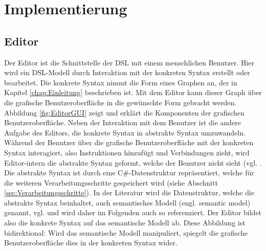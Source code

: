 \chapter{Implementierung}
\label{chap:Implementierung}

\section{Editor}
\label{sec:Editor}
Der Editor ist die Schnittstelle der DSL mit einem menschlichen Benutzer. Hier wird ein DSL-Modell durch Interaktion mit der konkreten Syntax erstellt oder bearbeitet. Die konkrete Syntax nimmt die Form eines Graphen an, der in Kapitel \ref{chap:Einleitung} beschrieben ist. Mit dem Editor kann dieser Graph über die grafische Benutzeroberfläche in die gewünschte Form gebracht werden. Abbildung \ref{fig:EditorGUI} zeigt und erklärt die Komponenten der grafischen Benutzeroberfläche.
\newline 
Neben der Interaktion mit dem Benutzer ist die andere Aufgabe des Editors, die konkrete Syntax in abstrakte Syntax umzuwandeln. Während der Benutzer über die grafische Benutzeroberfläche mit der konkreten Syntax interagiert, also Instruktionen hinzufügt und Verbindungen zieht, wird Editor-intern die abstrakte Syntax geformt, welche der Benutzer nicht sieht (vgl. \cite[S. 68]{Voelter:13}. Die abstrakte Syntax ist durch eine C\#-Datenstruktur repräsentiert, welche für die weiteren Verarbeitungsschritte gespeichert wird (siehe Abschnitt \ref{sec:Verarbeitungsschritte}). In der Literatur wird die Datenstruktur, welche die abstrakte Syntax beinhaltet, auch semantisches Modell (engl. semantic model) genannt, vgl. \cite[S. 16ff]{Fowler:11} und wird daher im Folgenden auch so referenziert. Der Editor bildet also die konkrete Syntax auf das semantische Modell ab. Diese Abbildung ist bidirektional: Wird das semantische Modell manipuliert, spiegelt die grafische Benutzeroberfläche dies in der konkreten Syntax wider. 
\newline
